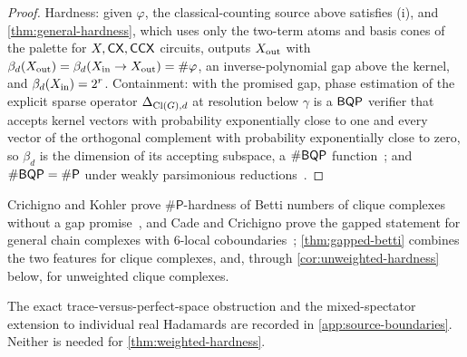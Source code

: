 \begin{proof}
Hardness: given \(\varphi\), the classical-counting source above satisfies
(i), and \cref{thm:general-hardness}, which uses only the two-term atoms and
basis cones of the palette for \(X,\mathsf{CX},\mathsf{CCX}\) circuits, outputs \(X_{\mathrm{out}}\)
with \(\beta_d(X_{\mathrm{out}})=\beta_d(X_{\mathrm{in}}\to X_{\mathrm{out}})=\#\varphi\), an inverse-polynomial
gap above the kernel, and \(\beta_d(X_{\mathrm{in}})=2^r\).  Containment: with the
promised gap, phase estimation of the explicit sparse operator
\(\Delta_{\operatorname{Cl}(G),d}\) at resolution below \(\gamma\) is a \(\mathsf{BQP}\) verifier
that accepts kernel vectors with probability exponentially close to one and
every vector of the orthogonal complement with probability exponentially
close to zero, so \(\beta_d\) is the dimension of its accepting subspace, a
\(\#\mathsf{BQP}\) function~\cite{brown2011computational,cade2024complexity}; and
\(\#\mathsf{BQP}=\#\mathsf P\) under weakly parsimonious
reductions~\cite{brown2011computational}.
\end{proof}

Crichigno and Kohler prove \(\#\mathsf P\)-hardness of Betti numbers of clique
complexes without a gap promise~\cite{crichigno2024clique}, and Cade and
Crichigno prove the gapped statement for general chain complexes with
\(6\)-local coboundaries~\cite{cade2024complexity}; \cref{thm:gapped-betti}
combines the two features for clique complexes, and, through
\cref{cor:unweighted-hardness} below, for unweighted clique complexes.

The exact trace-versus-perfect-space obstruction and the mixed-spectator
extension to individual real Hadamards are recorded in
\cref{app:source-boundaries}.  Neither is needed for
\cref{thm:weighted-hardness}.
